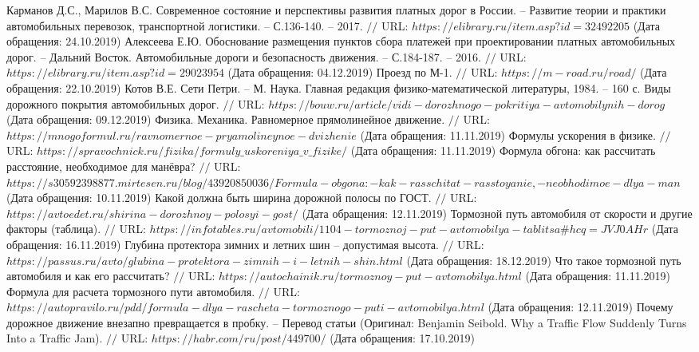 \begin{thebibliography}{00}
	Карманов Д.С., Марилов В.С. Современное состояние и перспективы развития платных дорог в России. -- Развитие теории и практики автомобильных перевозок, транспортной логистики. -- С.136-140. -- 2017. $//$ URL: $https://elibrary.ru/item.asp?id=32492205$ (Дата обращения: 24.10.2019)
	Алексеева Е.Ю. Обоснование размещения пунктов сбора платежей при проектировании платных автомобильных дорог. -- Дальний Восток. Автомобильные дороги и безопасность движения. -- С.184-187. -- 2016. $//$ URL: $https://elibrary.ru/item.asp?id=29023954$ (Дата обращения: 04.12.2019)
	Проезд по М-1. $//$ URL: $https://m-road.ru/road/$ (Дата обращения: 22.10.2019)
	Котов В.Е. Сети Петри. -- М. Наука. Главная редакция физико-математической литературы, 1984. -- 160 с.
	Виды дорожного покрытия автомобильных дорог. $//$ URL: $https://bouw.ru/article/vidi-dorozhnogo-pokritiya-avtomobilynih-dorog$ (Дата обращения: 09.12.2019)
	Физика. Механика. Равномерное прямолинейное движение. $//$ URL: $https://mnogoformul.ru/ravnomernoe-pryamolineynoe-dvizhenie$ (Дата обращения: 11.11.2019)
	Формулы ускорения в физике. $//$ URL: $https://spravochnick.ru/fizika/formuly\_uskoreniya\_v\_fizike/$ (Дата обращения: 11.11.2019)
	Формула обгона: как рассчитать расстояние, необходимое для манёвра? $//$ URL: $https://s30592398877.mirtesen.ru/blog/43920850036/Formula-obgona:-kak-rasschitat-rasstoyanie,-neobhodimoe-dlya-man$ (Дата обращения: 10.11.2019)
	Какой должна быть ширина дорожной полосы по ГОСТ. $//$ URL: $https://avtoedet.ru/shirina-dorozhnoy-polosyi-gost/$ (Дата обращения: 12.11.2019)
	Тормозной путь автомобиля от скорости и другие факторы (таблица). $//$ URL: $https://infotables.ru/avtomobili/1104-tormoznoj-put-avtomobilya-tablitsa\#hcq=JVJ0AHr$ (Дата обращения: 16.11.2019)
	Глубина протектора зимних и летних шин -- допустимая высота. $//$ URL: $ https://passus.ru/avto/glubina-protektora-zimnih-i-letnih-shin.html$ (Дата обращения: 18.12.2019)
	Что такое тормозной путь автомобиля и как его рассчитать? $//$ URL: $https://autochainik.ru/tormoznoy-put-avtomobilya.html$ (Дата обращения: 11.11.2019)
	Формула для расчета тормозного пути автомобиля. $//$ URL: $https://autopravilo.ru/pdd/formula-dlya-rascheta-tormoznogo-puti-avtomobilya.html$ (Дата обращения: 12.11.2019)
	Почему дорожное движение внезапно превращается в пробку. -- Перевод статьи (Оригинал: Benjamin Seibold. Why a Traffic Flow Suddenly Turns Into a Traffic Jam). $//$ URL: $https://habr.com/ru/post/449700/$ (Дата обращения: 17.10.2019)

\end{thebibliography}
